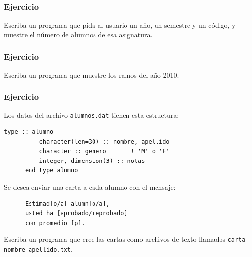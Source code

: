 \documentclass[12pt]{beamer}
\begin{document}
  \begin{frame}
    \frametitle{Ejercicio}
    Escriba un programa que pida al usuario
    un año, un semestre y un código,
    y muestre el número de alumnos de esa asignatura.
  \end{frame}

  \begin{frame}
    \frametitle{Ejercicio}
    Escriba un programa que muestre los ramos del año 2010.
  \end{frame}

  \begin{frame}[fragile]
    \frametitle{Ejercicio}
    \small
    Los datos del archivo \texttt{alumnos.dat} tienen esta estructura:
    \begin{lstlisting}[basicstyle=\small,gobble=6]
      type :: alumno
          character(len=30) :: nombre, apellido
          character :: genero       ! 'M' o 'F'
          integer, dimension(3) :: notas
      end type alumno
    \end{lstlisting}
    Se desea enviar una carta a cada alumno con el mensaje:
    \begin{Verbatim}
      Estimad[o/a] alumn[o/a],
      usted ha [aprobado/reprobado]
      con promedio [p].
    \end{Verbatim}
    Escriba un programa que cree las cartas
    como archivos de texto llamados \texttt{carta-nombre-apellido.txt}.

\end{frame}
\end{document}
